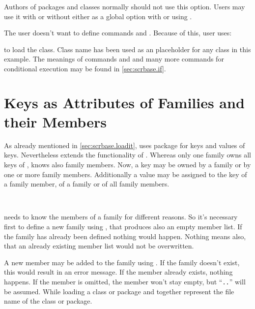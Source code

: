 Authors of packages and classes normally should not use this option. Users may
use it with or without  either as a global option with
 or using .
\begin{Example}
  The user doesn't want  to define commands 
  and . Because of this, user uses:
  to load the class. Class name  has been used as an placeholder
  for any class in this example. The meanings of commands  and
   and many more commands for conditional execution
  may be found in \autoref{sec:scrbase.if}.
\end{Example}
%
%


\section{Keys as Attributes of Families and their Members}
\label{sec:scrbase.keyvalue}

As already mentioned in \autoref{sec:scrbase.loadit},  uses
package  for keys and values of keys. Nevertheless
 extends the functionality of . Whereas only
one family owns all keys of ,  knows also
family members. Now, a key may be owned by a family or by one or more family
members. Additionally a value may be assigned to the key of a family member,
of a family or of all family members.

\begin{Declaration}
  \\
\end{Declaration}
%
%
 needs to know the members of a family for different
reasons. So it's necessary first to define a new family using
, that produces also an empty member list. If the family
has already been defined nothing would happen. Nothing means also, that an
already existing member list would not be overwritten.

A new member may be added to the family using . If
the family doesn't exist, this would result in an error message. If the member
already exists, nothing happens. If the member is omitted, the member won't
stay empty, but ``\texttt{.}\texttt{.}'' will
be assumed. While loading a class or package  and
 together represent the file name of the class or package.

